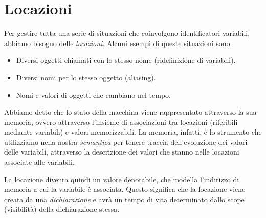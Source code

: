 \documentclass[a4paper,oneside,titlepage]{book}
\begin{document}
\section{Locazioni}
Per gestire tutta una serie di situazioni che coinvolgono identificatori variabili, abbiamo bisogno delle \textit{locazioni}. Alcuni esempi di queste situazioni sono:
\begin{itemize}
	\item Diversi oggetti chiamati con lo stesso nome (ridefinizione di variabili).
	\item Diversi nomi per lo stesso oggetto (aliasing).
	\item Nomi e valori di oggetti che cambiano nel tempo.
\end{itemize}
Abbiamo detto che lo stato della macchina viene rappresentato attraverso la sua memoria, ovvero attraverso l'insieme di associazioni tra locazioni (riferibili mediante variabili) e valori memorizzabili. La memoria, infatti, è lo strumento che utilizziamo nella nostra \textit{semantica} per tenere traccia dell'evoluzione dei valori delle variabili, attraverso la descrizione dei valori che stanno nelle locazioni associate alle variabili.

La locazione diventa quindi un valore denotabile, che modella l'indirizzo di memoria a cui la variabile è associata. Questo significa che la locazione viene creata da una \textit{dichiarazione} e avrà un tempo di vita determinato dallo scope (visibilità) della dichiarazione stessa.
\end{document}
